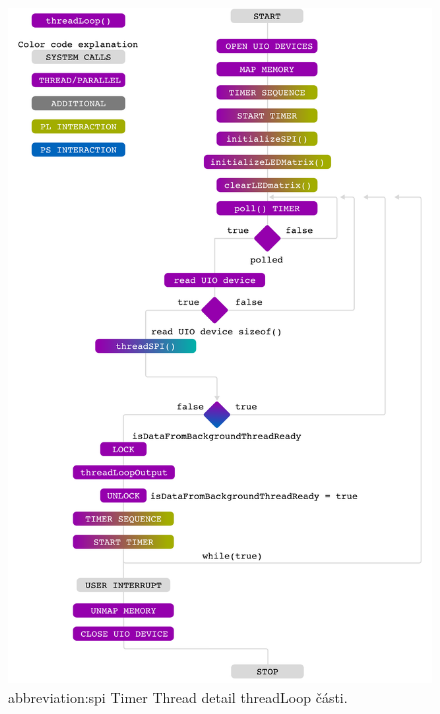 \documentclass[a4paper, twoside, 11pt]{article}
\newcommand{\fbar}{\FloatBarrier}
\begin{document}
 		\begin{figure}[htbp!]
	  		\centering
	  		\includegraphics[width=1\textwidth]{src/pdf/threadLoop.pdf}
	 		\caption{\gls{abbreviation:spi} Timer Thread detail threadLoop části.}
  			\label{fig:threadLoop}
		\end{figure}
		\fbar
\end{document}
